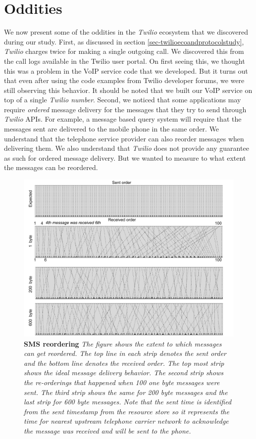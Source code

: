 \section{Oddities}
\label{sec-oddities}

We now present some of the oddities in the \textit{Twilio} ecosystem that we discovered during our study. First, as discussed in section \ref{sec-twilioecoandprotocolstudy}, \textit{Twilio} charges twice for making a single outgoing call. We discovered this from the call logs available in the Twilio user portal. On first seeing this, we thought this was a problem in the VoIP service code that we developed. But it turns out that even after using the code examples from Twilio developer forums, we were still observing this behavior. It should be noted that we built our VoIP service on top of a single \textit{Twilio number}. Second, we noticed that some applications may require \textit{ordered} message delivery for the messages that they try to send through \textit{Twilio} APIs. For example, a message based query system will require that the messages sent are delivered to the mobile phone in the same order. We understand that the telephone service provider can also reorder messages when delivering them. We also understand that \textit{Twilio} does not provide any guarantee as such for ordered message delivery. But we wanted to measure to what extent the messages can be reordered. 

\begin{figure}[t!] \centering
\includegraphics[width=\textwidth]{figs/reordering.pdf}
\caption{\textbf{SMS reordering} {\footnotesize\textit{
The figure shows the extent to which messages can get reordered. The top line in each strip denotes the sent order and the bottom line denotes the received order. The top most strip shows the ideal message delivery behavior. The second strip shows the re-orderings that happened when 100 one byte messages were sent. The third strip shows the same for 200 byte messages and the last strip for 600 byte messages. Note that the sent time is identified from the \textit{sent timestamp} from the resource store so it represents the time for nearest upstream telephone carrier network to acknowledge the message was received and will be sent to the phone. 
}}}
\label{fig:reordering}
\end{figure}


